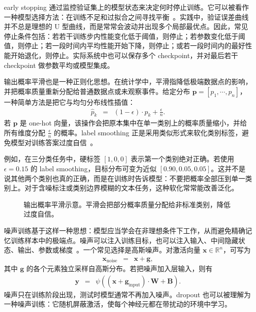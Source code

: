 early stopping 通过监控验证集上的模型状态来决定何时停止训练。它可以被看作一种模型选择方法：在训练不足和过拟合之间寻找平衡~\cite{GoodfellowEtAl2016DeepLearning,prechelt1998early}。实践中，验证误差曲线并不总是理想的 U 型曲线，而是常常会波动并出现多个局部最优点。因此，常见停止条件包括：若若干训练步内性能变化低于阈值，则停止；若参数变化低于阈值，则停止；若一段时间内平均性能开始下降，则停止；或若一段时间内的最好性能开始退化，则停止。实际系统中也可以保存多个 checkpoint，并对最后若干 checkpoint 做参数平均或模型集成。

输出概率平滑也是一种正则化思想。在统计学中，平滑指降低极端数据点的影响，并把概率质量重新分配给普通数据点或未观察事件。给定分布 $\mathbf{p}=[p_1,\cdots,p_n]$，一种简单方法是把它与均匀分布线性插值：
\begin{eqnarray}
\hat{p}_k
& = &
(1-\epsilon)\cdot p_k+\frac{\epsilon}{n}.
\end{eqnarray}
若 $\mathbf{p}$ 是 one-hot 向量，该操作会把原本集中在单一类别上的概率质量缩小，并给所有维度分配 $\frac{\epsilon}{n}$ 的概率。label smoothing 正是采用类似形式来软化类别标签，避免模型对训练答案过度自信~\cite{SzegedyEtAl2016LabelSmoothing}。

例如，在三分类任务中，硬标签 $[1,0,0]$ 表示第一个类别绝对正确。若使用 $\epsilon=0.15$ 的 label smoothing，目标分布可变为近似 $[0.90,0.05,0.05]$。这并不是说其他两个类别也真的正确，而是在训练时告诉模型：不要把概率全部压到单一类别上。对于含噪标注或类别边界模糊的文本任务，这种软化常常能改善泛化。


\begin{figure}[htbp]
  \centering
  
  \caption{输出概率平滑示意。平滑会把部分概率质量分配给非标准类别，降低过度自信。}
  \label{fig:nlpbook-smoothing-interpolation}
\end{figure}

噪声训练基于这样一种思想：模型应当学会在非理想条件下工作，从而避免精确记忆训练样本中的极端点。噪声可以注入训练目标，也可以注入输入、中间隐藏状态、输出、参数或梯度~\cite{plaut-etal:1986experiments,Holmstrom-Koistinen:1992noise,bishop:1995training,graves-etal:2013speech,neelakantan-etal:2015adding}。一个常见选择是高斯噪声。对激活向量 $\mathbf{x}\in\mathbb{R}^n$，可写为
\begin{eqnarray}
\mathbf{x}_{\mathrm{noise}}
& = &
\mathbf{x}+\mathbf{g},
\end{eqnarray}
\noindent 其中 $\mathbf{g}$ 的各个元素独立采样自高斯分布。若把噪声加入层输入，则有
\begin{eqnarray}
\mathbf{y}
& = &
\psi((\mathbf{x}+\mathbf{g}_{\mathrm{input}})\cdot\mathbf{W}+\mathbf{B}).
\end{eqnarray}
噪声只在训练阶段出现，测试时模型通常不再加入噪声。dropout 也可以被理解为一种噪声训练：它随机屏蔽激活，使每个神经元都在带扰动的环境中学习。

